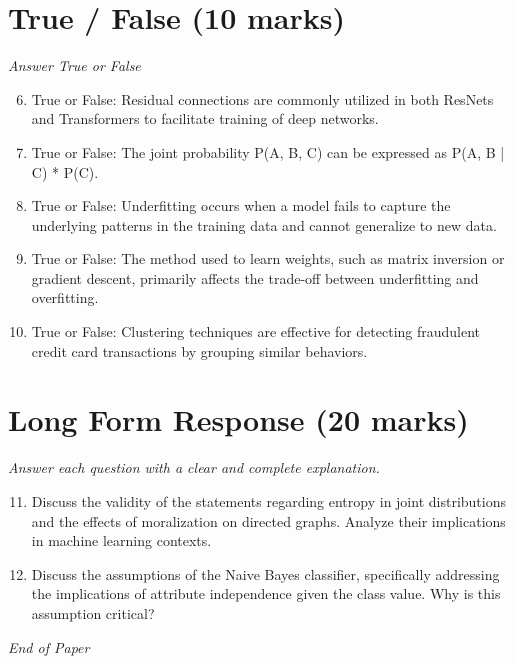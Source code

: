 \documentclass[12pt]{article}
\begin{document}
\section*{True / False (10 marks)}
\textit{Answer True or False}
\begin{enumerate}[label=\arabic*.]
\setcounter{enumi}{5}
\item True or False: Residual connections are commonly utilized in both ResNets and Transformers to facilitate training of deep networks.
\item True or False: The joint probability P(A, B, C) can be expressed as P(A, B | C) * P(C).
\item True or False: Underfitting occurs when a model fails to capture the underlying patterns in the training data and cannot generalize to new data.
\item True or False: The method used to learn weights, such as matrix inversion or gradient descent, primarily affects the trade-off between underfitting and overfitting.
\item True or False: Clustering techniques are effective for detecting fraudulent credit card transactions by grouping similar behaviors.
\end{enumerate}

\section*{Long Form Response (20 marks)}
\textit{Answer each question with a clear and complete explanation.}
\begin{enumerate}[label=\arabic*.]
\setcounter{enumi}{10}
\item Discuss the validity of the statements regarding entropy in joint distributions and the effects of moralization on directed graphs. Analyze their implications in machine learning contexts.
\item Discuss the assumptions of the Naive Bayes classifier, specifically addressing the implications of attribute independence given the class value. Why is this assumption critical?
\end{enumerate}

\vfill
\noindent\textit{End of Paper}
\end{document}
